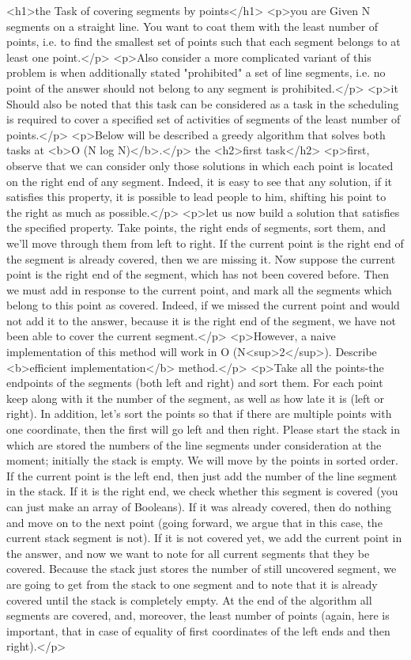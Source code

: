 <h1>the Task of covering segments by points</h1>
<p>you are Given N segments on a straight line. You want to coat them with the least number of points, i.e. to find the smallest set of points such that each segment belongs to at least one point.</p>
<p>Also consider a more complicated variant of this problem is when additionally stated "prohibited" a set of line segments, i.e. no point of the answer should not belong to any segment is prohibited.</p>
<p>it Should also be noted that this task can be considered as a task in the scheduling is required to cover a specified set of activities of segments of the least number of points.</p>
<p>Below will be described a greedy algorithm that solves both tasks at <b>O (N log N)</b>.</p>
the <h2>first task</h2>
<p>first, observe that we can consider only those solutions in which each point is located on the right end of any segment. Indeed, it is easy to see that any solution, if it satisfies this property, it is possible to lead people to him, shifting his point to the right as much as possible.</p>
<p>let us now build a solution that satisfies the specified property. Take points, the right ends of segments, sort them, and we'll move through them from left to right. If the current point is the right end of the segment is already covered, then we are missing it. Now suppose the current point is the right end of the segment, which has not been covered before. Then we must add in response to the current point, and mark all the segments which belong to this point as covered. Indeed, if we missed the current point and would not add it to the answer, because it is the right end of the segment, we have not been able to cover the current segment.</p>
<p>However, a naive implementation of this method will work in O (N<sup>2</sup>). Describe <b>efficient implementation</b> method.</p>
<p>Take all the points-the endpoints of the segments (both left and right) and sort them. For each point keep along with it the number of the segment, as well as how late it is (left or right). In addition, let's sort the points so that if there are multiple points with one coordinate, then the first will go left and then right. Please start the stack in which are stored the numbers of the line segments under consideration at the moment; initially the stack is empty. We will move by the points in sorted order. If the current point is the left end, then just add the number of the line segment in the stack. If it is the right end, we check whether this segment is covered (you can just make an array of Booleans). If it was already covered, then do nothing and move on to the next point (going forward, we argue that in this case, the current stack segment is not). If it is not covered yet, we add the current point in the answer, and now we want to note for all current segments that they be covered. Because the stack just stores the number of still uncovered segment, we are going to get from the stack to one segment and to note that it is already covered until the stack is completely empty. At the end of the algorithm all segments are covered, and, moreover, the least number of points (again, here is important, that in case of equality of first coordinates of the left ends and then right).</p>
